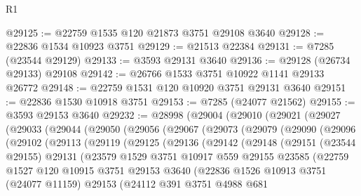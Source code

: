 \begin{lexlean}{R1}
\begin{coremodule}
@29125 := @22759 @1535 @120 @21873 @3751 @29108 @3640
@29128 := @22836 @1534 @10923 @3751
@29129 := @21513 @22384
@29131 := @7285 (@23544 @29129)
@29133 := @3593 @29131 @3640
@29136 := @29128 (@26734 @29133) @29108
@29142 := @26766 @1533 @3751 @10922 @1141 @29133 @26772
@29148 := @22759 @1531 @120 @10920 @3751 @29131 @3640
@29151 := @22836 @1530 @10918 @3751
@29153 := @7285 (@24077 @21562)
@29155 := @3593 @29153 @3640
@29232 := @28998
    (@29004
      (@29010
        (@29021
          (@29027
            (@29033
              (@29044
                (@29050
                  (@29056
                    (@29067
                      (@29073
                        (@29079
                          (@29090
                            (@29096
                              (@29102
                                (@29113
                                  (@29119
                                    (@29125
                                      (@29136
                                        (@29142
                                          (@29148
                                            (@29151
                                              (@23544 @29155)
                                              @29131
                                              (@23579
                                                @1529
                                                @3751
                                                @10917
                                                @559
                                                @29155
                                                @23585
                                                (@22759
                                                  @1527
                                                  @120
                                                  @10915
                                                  @3751
                                                  @29153
                                                  @3640
                                                  (@22836
                                                    @1526
                                                    @10913
                                                    @3751
                                                    (@24077 @11159)
                                                    @29153
                                                    (@24112
                                                      @391
                                                      @3751
                                                      @4988
                                                      @681

\end{coremodule}
\end{lexlean}
